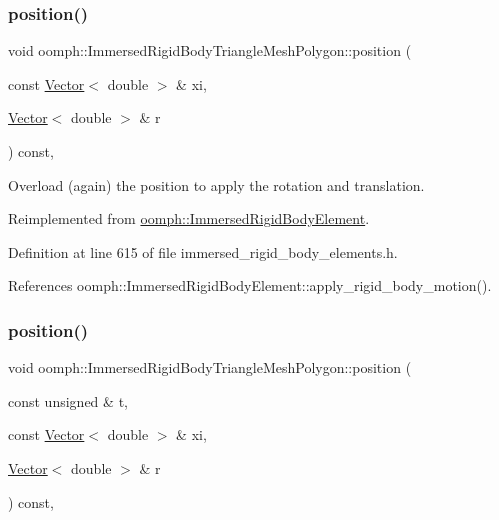 \subsubsection{\texorpdfstring{position()}{position()}\hspace{0.1cm}{\footnotesize\ttfamily [1/2]}}
{\footnotesize\ttfamily void oomph\+::\+Immersed\+Rigid\+Body\+Triangle\+Mesh\+Polygon\+::position (\begin{DoxyParamCaption}\item[{const \hyperlink{classoomph_1_1Vector}{Vector}$<$ double $>$ \&}]{xi,  }\item[{\hyperlink{classoomph_1_1Vector}{Vector}$<$ double $>$ \&}]{r }\end{DoxyParamCaption}) const\hspace{0.3cm}{\ttfamily [inline]}, {\ttfamily [virtual]}}



Overload (again) the position to apply the rotation and translation. 



Reimplemented from \hyperlink{classoomph_1_1ImmersedRigidBodyElement_a14f5acb186ecd1168dfa08dcf242c538}{oomph\+::\+Immersed\+Rigid\+Body\+Element}.



Definition at line 615 of file immersed\+\_\+rigid\+\_\+body\+\_\+elements.\+h.



References oomph\+::\+Immersed\+Rigid\+Body\+Element\+::apply\+\_\+rigid\+\_\+body\+\_\+motion().

\mbox{\label{classoomph_1_1ImmersedRigidBodyTriangleMeshPolygon_ad1bd014b31d75703384be201ab65e80f}} 
\subsubsection{\texorpdfstring{position()}{position()}\hspace{0.1cm}{\footnotesize\ttfamily [2/2]}}
{\footnotesize\ttfamily void oomph\+::\+Immersed\+Rigid\+Body\+Triangle\+Mesh\+Polygon\+::position (\begin{DoxyParamCaption}\item[{const unsigned \&}]{t,  }\item[{const \hyperlink{classoomph_1_1Vector}{Vector}$<$ double $>$ \&}]{xi,  }\item[{\hyperlink{classoomph_1_1Vector}{Vector}$<$ double $>$ \&}]{r }\end{DoxyParamCaption}) const\hspace{0.3cm}{\ttfamily [inline]}, {\ttfamily [virtual]}}




